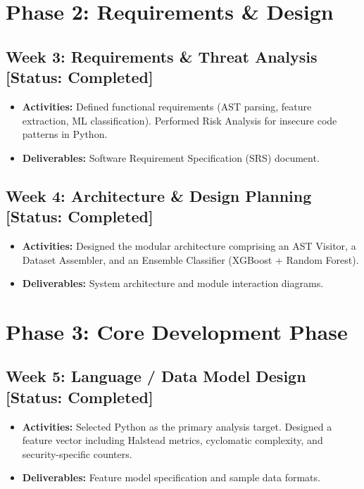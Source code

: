 \documentclass[12pt,a4paper]{article}
\begin{document}
\section{Phase 2: Requirements \& Design}

\subsection*{Week 3: Requirements \& Threat Analysis [Status: Completed]}
\begin{itemize}[noitemsep,topsep=0pt]
    \item \textbf{Activities:} Defined functional requirements (AST parsing, feature extraction, ML classification). Performed Risk Analysis for insecure code patterns in Python.
    \item \textbf{Deliverables:} Software Requirement Specification (SRS) document.
\end{itemize}

\subsection*{Week 4: Architecture \& Design Planning [Status: Completed]}
\begin{itemize}[noitemsep,topsep=0pt]
    \item \textbf{Activities:} Designed the modular architecture comprising an AST Visitor, a Dataset Assembler, and an Ensemble Classifier (XGBoost + Random Forest).
    \item \textbf{Deliverables:} System architecture and module interaction diagrams.
\end{itemize}

\section{Phase 3: Core Development Phase}

\subsection*{Week 5: Language / Data Model Design [Status: Completed]}
\begin{itemize}[noitemsep,topsep=0pt]
    \item \textbf{Activities:} Selected Python as the primary analysis target. Designed a feature vector including Halstead metrics, cyclomatic complexity, and security-specific counters.
    \item \textbf{Deliverables:} Feature model specification and sample data formats.
\end{itemize}
\end{document}
